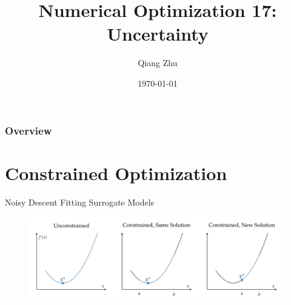 \documentclass{beamer}
\title[Constrained Optimization]{Numerical Optimization 17: Uncertainty} %
\author{Qiang Zhu} %
\institute[University of Nevada Las Vegas] %
{
University of Nevada Las Vegas\\ %
\medskip
}
\date{\today} %
\begin{document}
\begin{frame}
\titlepage %
\end{frame}

\begin{frame}
\frametitle{Overview} %
\tableofcontents %
\end{frame}



\section{Constrained Optimization}
\begin{frame}{Noisy Descent}
Fitting Surrogate Models
\begin{figure}
\centering
\includegraphics[width=120mm]{Figs/constraint-ab.jpeg}
\end{figure}   

\end{frame}
\end{document}
